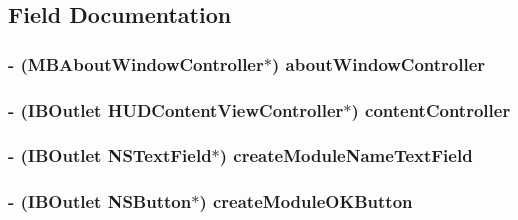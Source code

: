 \subsection{Field Documentation}
\hypertarget{interface_app_controller_a996d28463c3bd7cb51fbc3ec2715d474}{
\subsubsection[{about\-Window\-Controller}]{\setlength{\rightskip}{0pt plus 5cm}-\/ ({\bf M\-B\-About\-Window\-Controller}$\ast$) about\-Window\-Controller\hspace{0.3cm}{\ttfamily [protected]}}}\label{interface_app_controller_a996d28463c3bd7cb51fbc3ec2715d474}
\hypertarget{interface_app_controller_add8b8156fae5882baadbc970259be514}{
\subsubsection[{content\-Controller}]{\setlength{\rightskip}{0pt plus 5cm}-\/ (I\-B\-Outlet H\-U\-D\-Content\-View\-Controller$\ast$) content\-Controller\hspace{0.3cm}{\ttfamily [protected]}}}\label{interface_app_controller_add8b8156fae5882baadbc970259be514}
\hypertarget{interface_app_controller_a4560b8a317e31fc0089a7b22012c7cda}{
\subsubsection[{create\-Module\-Name\-Text\-Field}]{\setlength{\rightskip}{0pt plus 5cm}-\/ (I\-B\-Outlet N\-S\-Text\-Field$\ast$) create\-Module\-Name\-Text\-Field\hspace{0.3cm}{\ttfamily [protected]}}}\label{interface_app_controller_a4560b8a317e31fc0089a7b22012c7cda}
\hypertarget{interface_app_controller_a39de0726ae67c4b54adfe94c003e6096}{
\subsubsection[{create\-Module\-O\-K\-Button}]{\setlength{\rightskip}{0pt plus 5cm}-\/ (I\-B\-Outlet N\-S\-Button$\ast$) create\-Module\-O\-K\-Button\hspace{0.3cm}{\ttfamily [protected]}}}\label{interface_app_controller_a39de0726ae67c4b54adfe94c003e6096}
